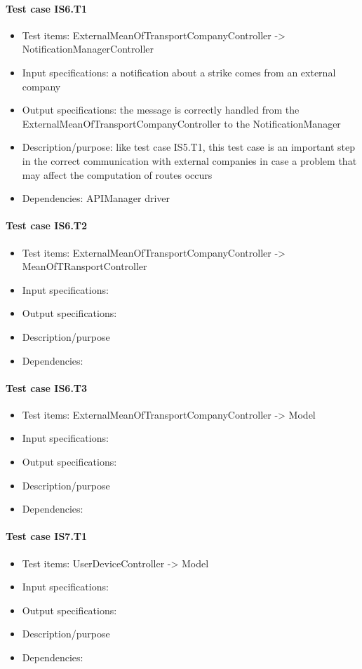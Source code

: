 \documentclass[a4paper,leqno]{article}
\begin{document}
\paragraph{Test case IS6.T1}
\begin{itemize}
	\item Test items: ExternalMeanOfTransportCompanyController -> NotificationManagerController
	\item Input specifications: a notification about a strike comes from an external company 
	\item Output specifications: the message is correctly handled from the ExternalMeanOfTransportCompanyController to the NotificationManager
	\item Description/purpose: like test case IS5.T1, this test case is an important step in the correct communication with external companies in case a problem that may affect the computation of routes occurs
	\item Dependencies: APIManager driver
\end{itemize}

\paragraph{Test case IS6.T2}
\begin{itemize}
	\item Test items: ExternalMeanOfTransportCompanyController -> MeanOfTRansportController
	\item Input specifications:
	\item Output specifications:
	\item Description/purpose
	\item Dependencies:
\end{itemize}

\paragraph{Test case IS6.T3}
\begin{itemize}
	\item Test items: ExternalMeanOfTransportCompanyController -> Model
	\item Input specifications:
	\item Output specifications:
	\item Description/purpose
	\item Dependencies:
\end{itemize}

\paragraph{Test case IS7.T1}
\begin{itemize}
	\item Test items: UserDeviceController -> Model
	\item Input specifications:
	\item Output specifications:
	\item Description/purpose
	\item Dependencies:
\end{itemize}
\end{document}
